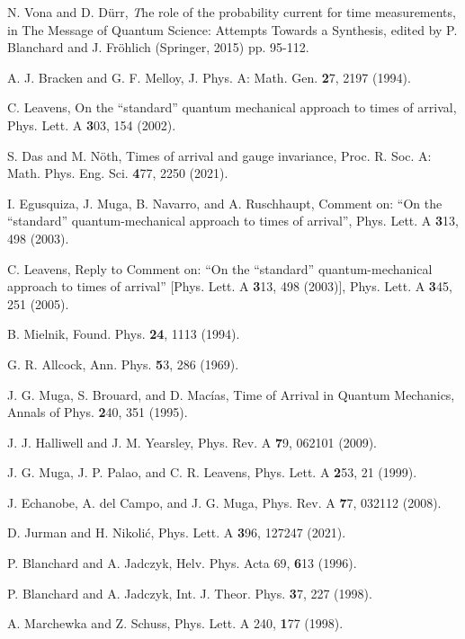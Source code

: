 \begin{thebibliography}{0}
 N. Vona and D. D\"urr, {\textit The role of the probability current for time measurements}, in The Message of Quantum Science: Attempts Towards a Synthesis, edited by P. Blanchard and J. Fr\"ohlich (Springer, 2015) pp. 95-112.

 A. J. Bracken and G. F. Melloy, J. Phys. A: Math. Gen. {\textbf 27}, 2197 (1994).

 C. Leavens, On the ``standard'' quantum mechanical approach to times of arrival, Phys. Lett. A {\textbf 303}, 154 (2002).

 S. Das and M. N\"oth, Times of arrival and gauge invariance, Proc. R. Soc. A: Math. Phys. Eng. Sci. {\textbf 477}, 2250 (2021).


 I. Egusquiza, J. Muga, B. Navarro, and A. Ruschhaupt, Comment on: ``On the ``standard'' quantum-mechanical approach to times of arrival'', Phys. Lett. A {\textbf 313}, 498 (2003).


 C. Leavens, Reply to Comment on: ``On the ``standard'' quantum-mechanical approach to times of arrival'' [Phys. Lett. A {\textbf 313}, 498 (2003)], Phys. Lett. A {\textbf 345}, 251 (2005).

 B. Mielnik, Found. Phys. \textbf{24}, 1113 (1994).


 G. R. Allcock, Ann. Phys. {\textbf 53}, 286 (1969).

 J. G. Muga, S. Brouard, and D. Mac\'ias, Time of Arrival in Quantum Mechanics, Annals of Phys. {\textbf 240}, 351 (1995).

 J. J. Halliwell and J. M. Yearsley, Phys. Rev. A {\textbf 79}, 062101 (2009).

 J. G. Muga, J. P. Palao, and C. R. Leavens, Phys. Lett. A {\textbf 253}, 21 (1999).


 J. Echanobe, A. del Campo, and J. G. Muga, Phys. Rev. A {\textbf 77},
032112 (2008).

 D. Jurman and H. Nikoli\'c, Phys. Lett. A {\textbf 396}, 127247 (2021).

 P. Blanchard and A. Jadczyk, Helv. Phys. Acta 69, {\textbf 613} (1996).


 P. Blanchard and A. Jadczyk, Int. J. Theor. Phys. {\textbf 37}, 227 (1998).

 A. Marchewka and Z. Schuss, Phys. Lett. A 240, {\textbf 177} (1998).


\end{thebibliography}
